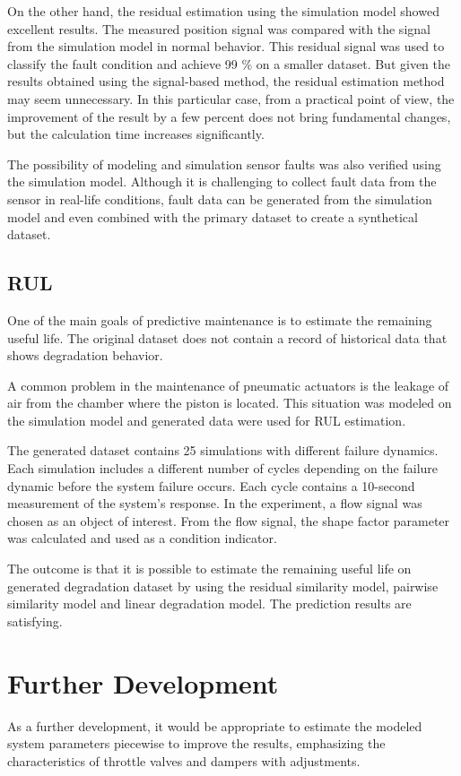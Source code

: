 On the other hand, the residual estimation using the simulation model
showed excellent results. The measured position signal was compared with
the signal from the simulation model in normal behavior. This residual
signal was used to classify the fault condition and achieve  99 \% on a
smaller dataset.  But given the results obtained using the signal-based
method, the residual estimation method may seem unnecessary. In this
particular case, from a practical point of view, the improvement of the
result by a few percent does not bring fundamental changes, but the
calculation time increases significantly. 

The possibility of modeling and simulation sensor faults was also verified
using the simulation model. Although it is challenging to collect fault
data from the sensor in real-life conditions, fault data can be generated
from the simulation model and even combined with the primary dataset to
create a synthetical dataset.

\subsection{RUL}
One of the main goals of predictive maintenance is to estimate the
remaining useful life. The original dataset does not contain a record of
historical data that shows degradation behavior. 

A common problem in the maintenance of pneumatic actuators is the leakage
of air from the chamber where the piston is located. This situation was
modeled on the simulation model and generated data were used for RUL
estimation. 

The generated dataset contains 25 simulations with different failure
dynamics. Each simulation includes a different number of cycles depending
on the failure dynamic before the system failure occurs.  Each cycle
contains a 10-second measurement of the system's response.  In the
experiment, a flow signal was chosen as an object of interest. From the
flow signal, the shape factor parameter was calculated and used as a
condition indicator. 

The outcome is that it is possible to estimate the remaining useful life on
generated degradation dataset by using the residual similarity model,
pairwise similarity model and linear degradation model. The prediction
results are satisfying.

\section{Further Development}
As a further development, it would be appropriate to estimate the modeled
system parameters piecewise to improve the results, emphasizing the
characteristics of throttle valves and dampers with adjustments. 

